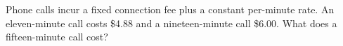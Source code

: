 Phone calls incur a fixed connection fee plus a constant per-minute rate. An eleven-minute call costs \$4.88 and a nineteen-minute call \$6.00. What does a fifteen-minute call cost?

